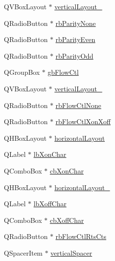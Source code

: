 \begin{DoxyCompactItemize}
\item 
Q\-V\-Box\-Layout $\ast$ \hyperlink{class_ui__mdt_serial_port_config_widget_a3d89ec4551628302696f5a2b85e42361}{vertical\-Layout\-\_}
\item 
Q\-Radio\-Button $\ast$ \hyperlink{class_ui__mdt_serial_port_config_widget_a3ad8d6b798356ba0891649e75182e1dd}{rb\-Parity\-None}
\item 
Q\-Radio\-Button $\ast$ \hyperlink{class_ui__mdt_serial_port_config_widget_ae1ce4b26a70ab70ce53f2b6078263e0c}{rb\-Parity\-Even}
\item 
Q\-Radio\-Button $\ast$ \hyperlink{class_ui__mdt_serial_port_config_widget_a0115a61b2d5d18a69dfe97c9b38ab171}{rb\-Parity\-Odd}
\item 
Q\-Group\-Box $\ast$ \hyperlink{class_ui__mdt_serial_port_config_widget_a4b5b85d8c299bde92ef95cba4d644357}{gb\-Flow\-Ctl}
\item 
Q\-V\-Box\-Layout $\ast$ \hyperlink{class_ui__mdt_serial_port_config_widget_a76228b345ecdb5f7e7e2ce6481c6ceb3}{vertical\-Layout\-\_}
\item 
Q\-Radio\-Button $\ast$ \hyperlink{class_ui__mdt_serial_port_config_widget_abe0ae8729d84ec9649524eea1ebf0e4c}{rb\-Flow\-Ctl\-None}
\item 
Q\-Radio\-Button $\ast$ \hyperlink{class_ui__mdt_serial_port_config_widget_ab4b226a301a95c7bc1db6eda166d56a6}{rb\-Flow\-Ctl\-Xon\-Xoff}
\item 
Q\-H\-Box\-Layout $\ast$ \hyperlink{class_ui__mdt_serial_port_config_widget_a6ae3bdc4ccb4e7fbca35fd8e4cd3196d}{horizontal\-Layout}
\item 
Q\-Label $\ast$ \hyperlink{class_ui__mdt_serial_port_config_widget_a41531dcdb3c5f7fb04b850b078344c35}{lb\-Xon\-Char}
\item 
Q\-Combo\-Box $\ast$ \hyperlink{class_ui__mdt_serial_port_config_widget_aef30953026911eeac301427dbf46a19f}{cb\-Xon\-Char}
\item 
Q\-H\-Box\-Layout $\ast$ \hyperlink{class_ui__mdt_serial_port_config_widget_a0d3262484b2951a81e10046a2e03b274}{horizontal\-Layout\-\_}
\item 
Q\-Label $\ast$ \hyperlink{class_ui__mdt_serial_port_config_widget_a498de5e4f313a717ae2660cac026e61d}{lb\-Xoff\-Char}
\item 
Q\-Combo\-Box $\ast$ \hyperlink{class_ui__mdt_serial_port_config_widget_a1fa11aa8b0c9e4a7fcbe9f3506b6a62c}{cb\-Xoff\-Char}
\item 
Q\-Radio\-Button $\ast$ \hyperlink{class_ui__mdt_serial_port_config_widget_a51dd5f1afb25436fa0a7dc2c867fe316}{rb\-Flow\-Ctl\-Rts\-Cts}
\item 
Q\-Spacer\-Item $\ast$ \hyperlink{class_ui__mdt_serial_port_config_widget_a8f344fc14811cf144465a9185c865490}{vertical\-Spacer}
\end{DoxyCompactItemize}



